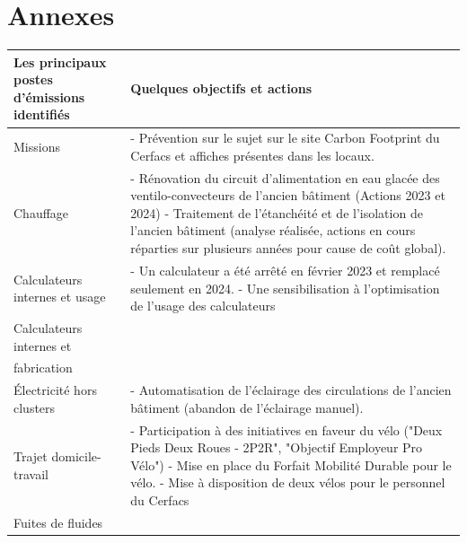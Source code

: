 \section*{Annexes}





\begin{table}[ht]
    \centering
    \begin{tabular}{|p{}|p{}|}
    \hline
    \textbf{Les principaux postes d’émissions identifiés} & \textbf{Quelques objectifs et actions} \\
    \hline
    Missions & 
    - Prévention sur le sujet sur le site Carbon Footprint du Cerfacs et affiches présentes dans les locaux. \\
    \hline
    Chauffage & 
    - Rénovation du circuit d’alimentation en eau glacée des ventilo-convecteurs de l’ancien bâtiment (Actions 2023 et 2024) \newline
    - Traitement de l’étanchéité et de l’isolation de l’ancien bâtiment (analyse réalisée, actions en cours réparties sur plusieurs années pour cause de coût global). \\
    \hline
    Calculateurs internes et usage & 
    - Un calculateur a été arrêté en février 2023 et remplacé seulement en 2024. \newline
    - Une sensibilisation à l’optimisation de l’usage des calculateurs \\
    \hline
    Calculateurs internes et \\fabrication &  \\
    \hline
    Électricité hors clusters & 
    - Automatisation de l’éclairage des circulations de l’ancien bâtiment (abandon de l’éclairage manuel). \\
    \hline
    Trajet domicile-travail & 
    - Participation à des initiatives en faveur du vélo ("Deux Pieds Deux Roues - 2P2R", "Objectif Employeur Pro Vélo") \newline
    - Mise en place du Forfait Mobilité Durable pour le vélo. \newline
    - Mise à disposition de deux vélos pour le personnel du Cerfacs \\
    \hline
    Fuites de fluides &  \\

\end{tabular}
\end{table}
